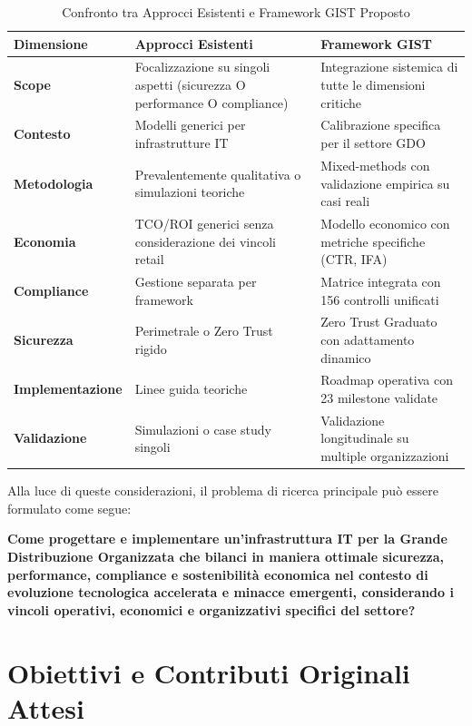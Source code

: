 \begin{table}[htbp]
\centering
\caption{Confronto tra Approcci Esistenti e Framework GIST Proposto}
\label{tab:confronto_approcci}
\begin{tabularx}{\textwidth}{@{}lXX@{}}
\toprule
\textbf{Dimensione} & \textbf{Approcci Esistenti} & \textbf{Framework GIST} \\
\midrule
\textbf{Scope} & Focalizzazione su singoli aspetti (sicurezza O performance O compliance) & Integrazione sistemica di tutte le dimensioni critiche \\
\textbf{Contesto} & Modelli generici per infrastrutture IT & Calibrazione specifica per il settore GDO \\
\textbf{Metodologia} & Prevalentemente qualitativa o simulazioni teoriche & Mixed-methods con validazione empirica su casi reali \\
\textbf{Economia} & TCO/ROI generici senza considerazione dei vincoli retail & Modello economico con metriche specifiche (CTR, IFA) \\
\textbf{Compliance} & Gestione separata per framework & Matrice integrata con 156 controlli unificati \\
\textbf{Sicurezza} & Perimetrale o Zero Trust rigido & Zero Trust Graduato con adattamento dinamico \\
\textbf{Implementazione} & Linee guida teoriche & Roadmap operativa con 23 milestone validate \\
\textbf{Validazione} & Simulazioni o case study singoli & Validazione longitudinale su multiple organizzazioni \\
\bottomrule
\end{tabularx}
\end{table}

Alla luce di queste considerazioni, il problema di ricerca principale può essere formulato come segue:
\label{ssec:domanda_ricerca}

\textbf{Come progettare e implementare un'infrastruttura IT per la Grande Distribuzione Organizzata che bilanci in maniera ottimale sicurezza, performance, compliance e sostenibilità economica nel contesto di evoluzione tecnologica accelerata e minacce emergenti, considerando i vincoli operativi, economici e organizzativi specifici del settore?}

\section{Obiettivi e Contributi Originali Attesi}

